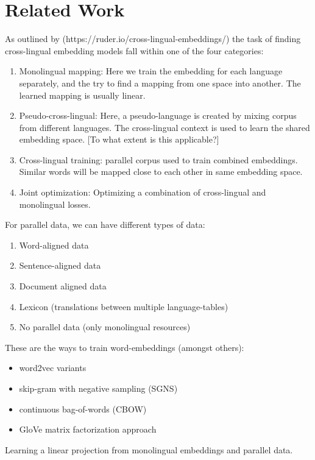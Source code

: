 \documentclass[a4paper,12pt,twoside,openright]{report}
\begin{document}
\chapter{Related Work}

As outlined by (https://ruder.io/cross-lingual-embeddings/) the task of finding cross-lingual embedding models fall within one of the four categories:

\begin{enumerate}
\item Monolingual mapping: Here we train the embedding for each language separately, and the try to find a mapping from one space into another.
The learned mapping is usually linear.
\item Pseudo-cross-lingual: Here, a pseudo-language is created by mixing corpus from different languages.
The cross-lingual context is used to learn the shared embedding space.
[To what extent is this applicable?]
\item Cross-lingual training: parallel corpus used to train combined embeddings. Similar words will be mapped close to each other in same embedding space.
\item Joint optimization: Optimizing a combination of cross-lingual and monolingual losses.
\end{enumerate}

For parallel data, we can have different types of data:

\begin{enumerate}
\item Word-aligned data
\item Sentence-aligned data
\item Document aligned data
\item Lexicon (translations between multiple language-tables)
\item No parallel data (only monolingual resources)
\end{enumerate}

These are the ways to train word-embeddings (amongst others):

\begin{itemize}
\item word2vec variants
\item skip-gram with negative sampling (SGNS)
\item continuous bag-of-words (CBOW)
\item GloVe matrix factorization approach
\end{itemize}

Learning a linear projection from monolingual embeddings and parallel data.
\end{document}
